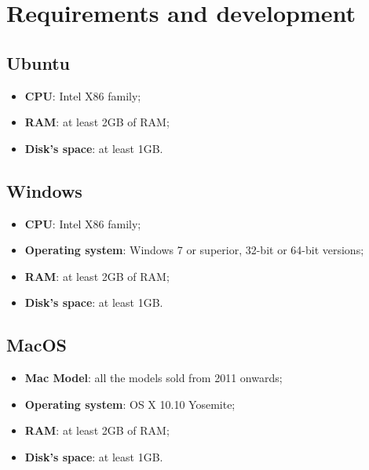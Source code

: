 \section{Requirements and development}
\subsection{Ubuntu}
\begin{itemize}
	\item \textbf{CPU}: Intel X86 family;
	\item \textbf{RAM}: at least 2GB of RAM;
	\item \textbf{Disk's space}: at least 1GB.
\end{itemize}	

\subsection{Windows}
\begin{itemize}
	\item \textbf{CPU}: Intel X86 family;
	\item \textbf{Operating system}: Windows 7 or superior, 32-bit or 64-bit versions;
	\item \textbf{RAM}: at least 2GB of RAM;
	\item \textbf{Disk's space}: at least 1GB.
\end{itemize}

\subsection{MacOS}
\begin{itemize}
	\item \textbf{Mac Model}: all the models sold from 2011 onwards;
	\item \textbf{Operating system}: OS X 10.10 Yosemite;
	\item \textbf{RAM}: at least 2GB of RAM;
	\item \textbf{Disk's space}: at least 1GB.
\end{itemize}

